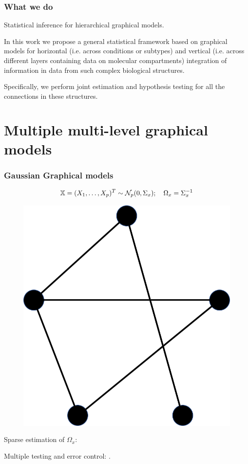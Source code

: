 \documentclass[10pt]{beamer}
\theoremstyle{definition}
\begin{document}
\begin{frame}
\frametitle{What we do}

{\colrbf Statistical inference for hierarchical graphical models.}
\vspace{1em}

In this work we propose a general statistical framework based on graphical models for {\colbit horizontal} (i.e. across conditions or subtypes) {\colbit and vertical} (i.e. across different layers containing data on molecular compartments) {\colbit integration of information} in data from such complex biological structures.

\vspace{1em}
Specifically, we perform {\colbit joint estimation and hypothesis testing} for all the connections in these structures.

\end{frame}


\section{Multiple multi-level graphical models}

\begin{frame}
\frametitle{Gaussian Graphical models}

\[
{\mathbb{X}} = (X_1, \ldots, X_p)^T \sim {\cal{N}}_p (0, \Sigma_x); \quad
\Omega_x = \Sigma_x^{-1}
\]

\begin{figure}
\centering
\includegraphics[width=.4\textwidth]{formulation_2}
\end{figure}

Sparse estimation of $\Omega_x$: {\colr \cite{MeisenBuhlmann06}}

Multiple testing and error control: {\colr \cite{DrtonPerlman07}}.

\end{frame}
\end{document}
